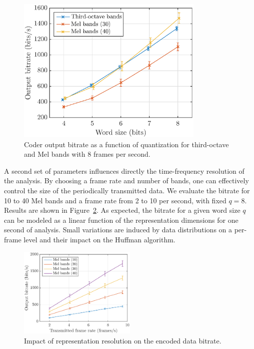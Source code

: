 \documentclass[sensors,article,submit,moreauthors,pdftex,10pt,a4paper]{mdpi}
\begin{document}
\begin{figure}[htbp]
	\centering
		\includegraphics[width=0.8\textwidth]{figures/bitrate_qall.eps}
	\caption{Coder output bitrate as a function of quantization for third-octave and Mel bands with 8 frames per second.}
	\label{fig:bitrate_q}
\end{figure}

A second set of parameters influences directly the time-frequency resolution of the analysis. By choosing a frame rate and number of bands, one can effectively control the size of the periodically transmitted data. We evaluate the bitrate for 10 to 40 Mel bands and a frame rate from 2 to 10 per second, with fixed $q = 8$. Results are shown in Figure~\ref{fig:bitrate_mel_avg}. As expected, the bitrate for a given word size $q$ can be modeled as a linear function of the representation dimensions for one second of analysis. Small variations are induced by data distributions on a per-frame level and their impact on the Huffman algorithm.

\begin{figure}[htbp]
	\centering
		\includegraphics[width=0.5\textwidth]{figures/bitrate_mel_avg.eps}
	\caption{Impact of representation resolution on the encoded data bitrate.}
	\label{fig:bitrate_mel_avg}
\end{figure}
\end{document}
